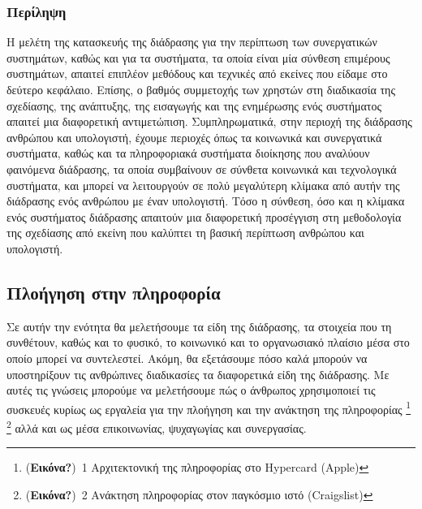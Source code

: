 \documentclass[
]{article}
\begin{document}
\hypertarget{ux3c0ux3b5ux3c1ux3afux3bbux3b7ux3c8ux3b7}{%
\subsubsection{Περίληψη}\label{ux3c0ux3b5ux3c1ux3afux3bbux3b7ux3c8ux3b7}}

Η μελέτη της κατασκευής της διάδρασης για την περίπτωση των συνεργατικών
συστημάτων, καθώς και για τα συστήματα, τα οποία είναι μία σύνθεση
επιμέρους συστημάτων, απαιτεί επιπλέον μεθόδους και τεχνικές από εκείνες
που είδαμε στο δεύτερο κεφάλαιο. Επίσης, ο βαθμός συμμετοχής των χρηστών
στη διαδικασία της σχεδίασης, της ανάπτυξης, της εισαγωγής και της
ενημέρωσης ενός συστήματος απαιτεί μια διαφορετική αντιμετώπιση.
Συμπληρωματικά, στην περιοχή της διάδρασης ανθρώπου και υπολογιστή,
έχουμε περιοχές όπως τα κοινωνικά και συνεργατικά συστήματα, καθώς και
τα πληροφοριακά συστήματα διοίκησης που αναλύουν φαινόμενα διάδρασης, τα
οποία συμβαίνουν σε σύνθετα κοινωνικά και τεχνολογικά συστήματα, και
μπορεί να λειτουργούν σε πολύ μεγαλύτερη κλίμακα από αυτήν της διάδρασης
ενός ανθρώπου με έναν υπολογιστή. Τόσο η σύνθεση, όσο και η κλίμακα ενός
συστήματος διάδρασης απαιτούν μια διαφορετική προσέγγιση στη μεθοδολογία
της σχεδίασης από εκείνη που καλύπτει τη βασική περίπτωση ανθρώπου και
υπολογιστή.

\hypertarget{ux3c0ux3bbux3bfux3aeux3b3ux3b7ux3c3ux3b7-ux3c3ux3c4ux3b7ux3bd-ux3c0ux3bbux3b7ux3c1ux3bfux3c6ux3bfux3c1ux3afux3b1}{%
\subsection{Πλοήγηση στην
πληροφορία}\label{ux3c0ux3bbux3bfux3aeux3b3ux3b7ux3c3ux3b7-ux3c3ux3c4ux3b7ux3bd-ux3c0ux3bbux3b7ux3c1ux3bfux3c6ux3bfux3c1ux3afux3b1}}

Σε αυτήν την ενότητα θα μελετήσουμε τα είδη της διάδρασης, τα στοιχεία
που τη συνθέτουν, καθώς και το φυσικό, το κοινωνικό και το οργανωσιακό
πλαίσιο μέσα στο οποίο μπορεί να συντελεστεί. Ακόμη, θα εξετάσουμε πόσο
καλά μπορούν να υποστηρίξουν τις ανθρώπινες διαδικασίες τα διαφορετικά
είδη της διάδρασης. Με αυτές τις γνώσεις μπορούμε να μελετήσουμε πώς ο
άνθρωπος χρησιμοποιεί τις συσκευές κυρίως ως εργαλεία για την πλοήγηση
και την ανάκτηση της πληροφορίας \footnote{(\textbf{Εικόνα?})~1
  Αρχιτεκτονική της πληροφορίας στο Hypercard (Apple)} \footnote{(\textbf{Εικόνα?})~2
  Ανάκτηση πληροφορίας στον παγκόσμιο ιστό (Craigslist)} αλλά και ως
μέσα επικοινωνίας, ψυχαγωγίας και συνεργασίας.
\end{document}
